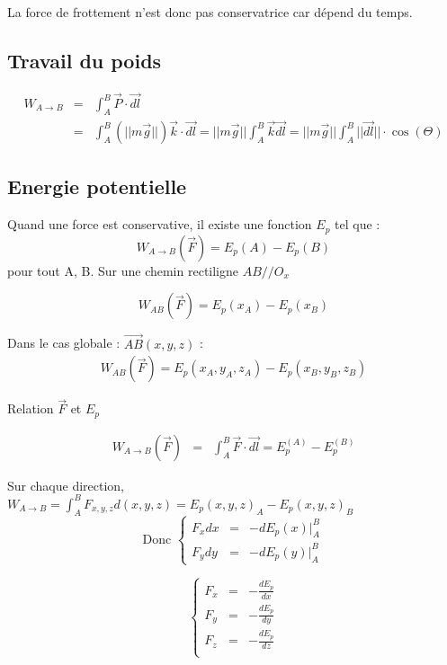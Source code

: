 La force de frottement n'est donc pas conservatrice car dépend du temps.

\subsection{Travail du poids}

\[\begin{array}{rcl}
		W_{A \to B} &=& \int_A^B \vec{P}\cdot \vec{dl} \\
											   &=& \int_A^B (||m\vec{g}||)\vec{k}\cdot\vec{dl} = ||m\vec{g}||\int_A^B \vec{k}\vec{dl} = ||m\vec{g}||\int_A^B ||\vec{dl}||\cdot \cos(\Theta)
\end{array}\]

\subsection{Energie potentielle}

Quand une force est conservative, il existe une fonction $E_p$ tel que : \[W_{A \to B} (\vec{F}) = E_p(A) - E_p(B)\] pour tout A, B.
Sur une chemin rectiligne $AB // O_x$

\[W_{AB}(\vec{F}) = E_p(x_A) - E_p(x_B)\]

Dans le cas globale : $\overrightarrow{AB}(x, y, z)$ : 
\[\begin{array}{rcl}
	W_{AB}(\vec{F}) = E_p(x_A, y_A, z_A) - E_p(x_B, y_B, z_B) 
\end{array}\]

Relation $\vec{F}$ et $E_p$

\[\begin{array}{rcl}
	W_{A \to B}(\vec{F}) &=& \int_A^B \vec{F}\cdot \vec{dl} = E_p^{(A)} - E_p^{(B)}
\end{array}\]

Sur chaque direction, $W_{A \to B} = \int_A^B F_{x, y, z} d(x, y, z) = E_p (x, y, z)_A - E_p(x, y, z)_B$ ~\\
\[\text{Donc }\left\{\begin{array}{rcl}
			F_x dx &=& -dE_p(x)|^B_A \\
			F_ydy &=& -dE_p(y)|^B_A \end{array}\right.\]

			\[\left\{\begin{array}{rcl}
			F_x &=& -\frac{dE_p}{dx} \\
						F_y &=& -\frac{dE_p}{dy} \\
						F_z &=& -\frac{dE_p}{dz} \\
				\end{array}\right.\]

